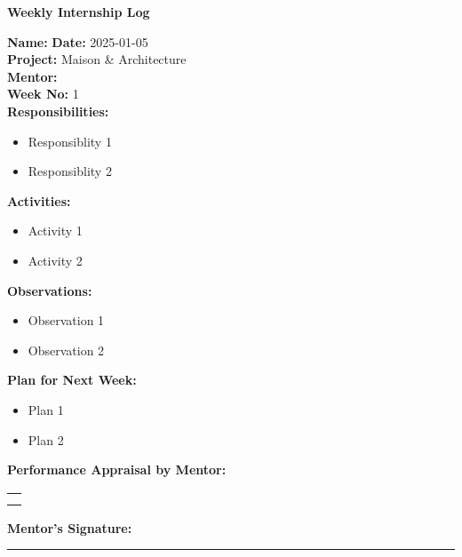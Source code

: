 \begin{center}
    \bfseries Weekly Internship Log
  \end{center}
  
  \noindent
  \textbf{Name:}  \hfill \textbf{Date:} 2025-01-05 \\
  \textbf{Project:} Maison \& Architecture  \hfill \\
  \textbf{Mentor:}   \\
  \textbf{Week No:} 1 \\
  
  \noindent
  \textbf{Responsibilities:}
  \begin{itemize}
      \item Responsiblity 1
      \item Responsiblity 2
  \end{itemize}
  
  \noindent
  \textbf{Activities:}
  \begin{itemize}
      \item Activity 1
      \item Activity 2
  \end{itemize}
  
  \noindent
  \textbf{Observations:}
  \begin{itemize}
      \item Observation 1
      \item Observation 2
  \end{itemize}
  
  \noindent
  \textbf{Plan for Next Week:}
  \begin{itemize}
      \item  Plan 1
      \item Plan 2
  \end{itemize}
  
  \noindent
  \textbf{Performance Appraisal by Mentor:} \\
  \begin{table}[h]
      \centering
      \noindent
      \begin{tabularx}{\textwidth} { 
          | >{\centering\arraybackslash}X| }
  
          \hline
            \\ \\       	                    
          \hline
      \end{tabularx}
  \end{table}
  
  
  \vspace{2em}
  \noindent
  \textbf{Mentor’s Signature:} \\
  \rule{0.4\textwidth}{0.5pt}